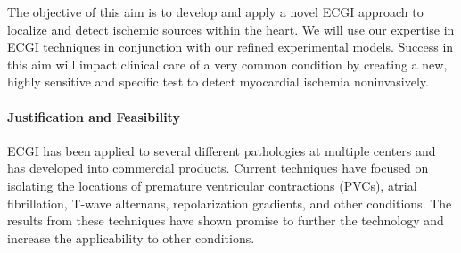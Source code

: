The objective of this aim is to develop and apply a novel ECGI approach to
localize and detect ischemic sources within the heart. We will use our
expertise in ECGI techniques in conjunction with our refined experimental
models. Success in this aim will impact clinical care of a very common
condition by creating a new, highly sensitive and specific test to detect
myocardial ischemia noninvasively.

\paragraph{Justification and Feasibility}
ECGI has been applied to several different pathologies at multiple centers
and has developed into commercial products. Current techniques have focused
on isolating the locations of premature ventricular contractions (PVCs), atrial
fibrillation, T-wave alternans, repolarization gradients, and other
conditions.\cite{BLZ:Pot2014,BLZ:Dub2015,BLZ:Wan2016a,RSM:Sha2015,BLZ:Wan2018}
The results from these techniques have shown promise to further the
technology and increase the applicability to other conditions.




